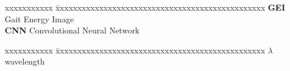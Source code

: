 \documentclass[MTech, hidelinks]{iiitdmdiss}
\begin{document}
\abbreviations

\noindent 
\begin{tabbing}
xxxxxxxxxxx \= xxxxxxxxxxxxxxxxxxxxxxxxxxxxxxxxxxxxxxxxxxxxxxxx \kill
\textbf{GEI}   \> Gait Energy Image\\
\textbf{CNN}   \> Convolutional Neural Network\\

\end{tabbing}

\pagebreak


\notation
\noindent
\begin{singlespace}
\begin{tabbing}
xxxxxxxxxxx \= xxxxxxxxxxxxxxxxxxxxxxxxxxxxxxxxxxxxxxxxxxxxxxxx \kill
\textbf{$\lambda$}  \> wavelength \\

\end{tabbing}
\end{singlespace}

\pagebreak
\clearpage

\pagestyle{fancy}
\fancyhf{}

\fancyhead[l]{\leftmark}
\fancyfoot[r]{\thepage}









\begin{singlespace}
  
\end{singlespace}
\end{document}
